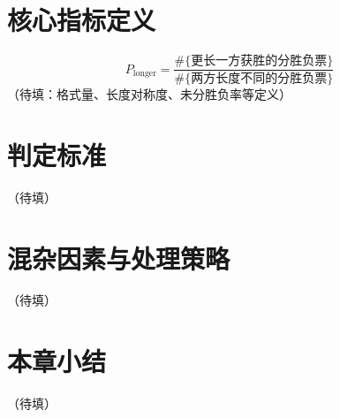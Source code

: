 
\section{核心指标定义}
\begin{equation}
P_{\text{longer}}=\frac{\#\{\text{更长一方获胜的分胜负票}\}}
                       {\#\{\text{两方长度不同的分胜负票}\}}
\label{eq:longer}
\end{equation}
（待填：格式量、长度对称度、未分胜负率等定义）

\section{判定标准}
（待填）

\section{混杂因素与处理策略}
（待填）

\section{本章小结}
（待填）
